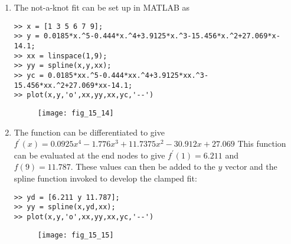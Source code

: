 \documentclass[../main.tex]{subfiles}
\begin{document}
\section{}
\begin{enumerate}[label=\bfseries(\alph*)]
\item The not-a-knot fit can be set up in MATLAB as
	\bigbreak
\begin{lstlisting}[numbers=none]
>> x = [1 3 5 6 7 9];
>> y = 0.0185*x.^5-0.444*x.^4+3.9125*x.^3-15.456*x.^2+27.069*x-14.1;
>> xx = linspace(1,9);
>> yy = spline(x,y,xx);
>> yc = 0.0185*xx.^5-0.444*xx.^4+3.9125*xx.^3-15.456*xx.^2+27.069*xx-14.1;
>> plot(x,y,'o',xx,yy,xx,yc,'--') 
\end{lstlisting}
	\begin{figure}[H]
		\texttt{[image: fig\_15\_14]}
		\label{fig:fig_15_14}
	\end{figure}
	\bigbreak
\item The function can be differentiated to give
	\bigbreak
$f^{\prime}(x)=0.0925 x^{4}-1.776 x^{3}+11.7375 x^{2}-30.912 x+27.069$
	\bigbreak
This function can be evaluated at the end nodes to give $f^{\prime}(1)=6.211$ and $f(9)=11.787$. These values can then be added to the $y$ vector and the spline function invoked to develop the clamped fit:
	\bigbreak
\begin{lstlisting}[numbers=none]
>> yd = [6.211 y 11.787];
>> yy = spline(x,yd,xx);
>> plot(x,y,'o',xx,yy,xx,yc,'--') 
\end{lstlisting}
	\begin{figure}[H]
		\texttt{[image: fig\_15\_15]}
		\label{fig:fig_15_15}
	\end{figure}
	\bigbreak
\end{enumerate}
\end{document}

